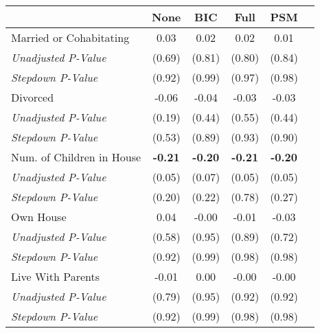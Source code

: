 \begin{tabular}{l c c c c c}
\toprule
 & None & BIC & Full & PSM \\
\midrule
Married or Cohabitating & 0.03 & 0.02 & 0.02 & 0.01 \\
\quad \textit{Unadjusted P-Value} & (0.69) & (0.81) & (0.80) & (0.84) \\
\quad \textit{Stepdown P-Value} & (0.92) & (0.99) & (0.97) & (0.98) \\
Divorced & -0.06 & -0.04 & -0.03 & -0.03 \\
\quad \textit{Unadjusted P-Value} & (0.19) & (0.44) & (0.55) & (0.44) \\
\quad \textit{Stepdown P-Value} & (0.53) & (0.89) & (0.93) & (0.90) \\
Num. of Children in House & \textbf{ -0.21 } & \textbf{ -0.20 } & \textbf{ -0.21 } & \textbf{ -0.20 } \\
\quad \textit{Unadjusted P-Value} & (0.05) & (0.07) & (0.05) & (0.05) \\
\quad \textit{Stepdown P-Value} & (0.20) & (0.22) & (0.78) & (0.27) \\
Own House & 0.04 & -0.00 & -0.01 & -0.03 \\
\quad \textit{Unadjusted P-Value} & (0.58) & (0.95) & (0.89) & (0.72) \\
\quad \textit{Stepdown P-Value} & (0.92) & (0.99) & (0.98) & (0.98) \\
Live With Parents & -0.01 & 0.00 & -0.00 & -0.00 \\
\quad \textit{Unadjusted P-Value} & (0.79) & (0.95) & (0.92) & (0.92) \\
\quad \textit{Stepdown P-Value} & (0.92) & (0.99) & (0.98) & (0.98) \\
\bottomrule
\end{tabular}
